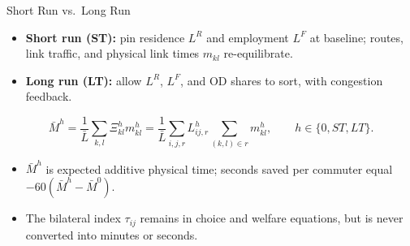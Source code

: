 \documentclass[11pt,aspectratio=169]{beamer}
\newcommand{\app}[1]{\allowbreak\hspace{0.25em}\hyperlink{#1}{\beamergotobutton{details}}}
\begin{document}
\begin{frame}{Short Run vs.\ Long Run}
\small
\begin{itemize}
  \item \textbf{Short run (ST):} pin residence $L^R$ and employment $L^F$ at baseline; routes, link traffic, and physical link times $m_{kl}$ re-equilibrate.
  \item \textbf{Long run (LT):} allow $L^R$, $L^F$, and OD shares to sort, with congestion feedback.
\end{itemize}
\vspace{-0.25em}
{\scriptsize
\begin{equation*}
\bar M^h
=\frac{1}{\bar L}\sum_{k,l}\Xi_{kl}^h m_{kl}^h
=\frac{1}{\bar L}\sum_{i,j,r}L_{ij,r}^h
  \sum_{(k,l)\in r}m_{kl}^h,
\qquad h\in\{0,ST,LT\}.
\end{equation*}
}
\vspace{-0.55em}
\begin{itemize}\footnotesize\setlength\itemsep{0.35em}
  \item $\bar M^h$ is expected additive physical time; seconds saved per commuter equal $-60(\bar M^h-\bar M^0)$.
  \item The bilateral index $\tau_{ij}$ remains in choice and welfare equations, but is never converted into minutes or seconds. \app{appphysicaltime}
\end{itemize}
\end{frame}
\end{document}
